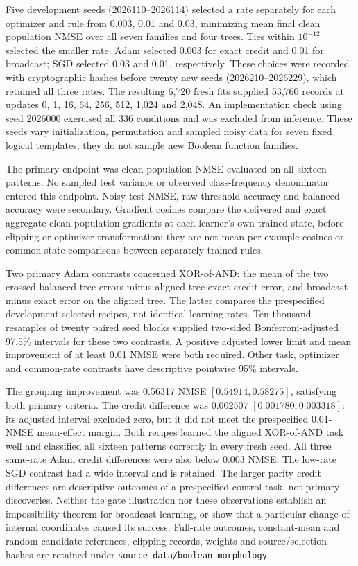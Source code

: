 Five development seeds (2026110--2026114) selected a rate separately for each
optimizer and rule from 0.003, 0.01 and 0.03, minimizing mean final clean
population NMSE over all seven families and four trees. Ties within
$10^{-12}$ selected the smaller rate. Adam selected 0.003 for exact credit
and 0.01 for broadcast; SGD selected 0.03 and 0.01, respectively. These choices were recorded with cryptographic hashes before twenty new
seeds (2026210--2026229), which
retained all three rates. The resulting 6,720 fresh fits supplied 53,760
records at updates 0, 1, 16, 64, 256, 512, 1,024 and 2,048. An implementation check using seed 2026000 exercised all 336 conditions
and was excluded from inference. These seeds vary initialization,
permutation and sampled noisy data for seven fixed logical templates;
they do not sample new Boolean function families.

The primary endpoint was clean population NMSE evaluated on all sixteen
patterns. No sampled test variance or observed class-frequency denominator
entered this endpoint. Noisy-test NMSE, raw threshold accuracy and balanced
accuracy were secondary. Gradient cosines compare the delivered and exact
aggregate clean-population gradients at each learner's own trained state,
before clipping or optimizer transformation; they are not mean per-example
cosines or common-state comparisons between separately trained rules.

Two primary Adam contrasts concerned XOR-of-AND: the mean of the two crossed
balanced-tree errors minus aligned-tree exact-credit error, and broadcast
minus exact error on the aligned tree. The latter compares the
prespecified development-selected recipes, not identical learning rates.
Ten thousand resamples of twenty paired seed blocks supplied two-sided
Bonferroni-adjusted 97.5\% intervals for these two contrasts. A positive
adjusted lower limit and mean improvement of at least 0.01 NMSE were both
required. Other task, optimizer and common-rate contrasts have descriptive
pointwise 95\% intervals.

The grouping improvement was 0.56317 NMSE $[0.54914,0.58275]$, satisfying both
primary criteria. The credit difference was 0.002507
$[0.001780,0.003318]$: its adjusted interval excluded zero, but it did not
meet the prespecified 0.01-NMSE mean-effect margin. Both recipes learned the
aligned XOR-of-AND task well and classified all sixteen patterns correctly
in every fresh seed. All three same-rate Adam credit differences
were also below 0.003 NMSE. The low-rate SGD contrast had a wide interval and
is retained. The larger parity credit differences are descriptive outcomes
of a prespecified control task, not primary discoveries. Neither the gate
illustration nor these observations establish an impossibility theorem for
broadcast learning, or show that a particular change of internal coordinates
caused its success. Full-rate outcomes, constant-mean and random-candidate
references, clipping records, weights and source/selection hashes are retained
under \texttt{source\_data/boolean\_morphology}.

